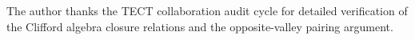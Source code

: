 \begin{acknowledgments}
The author thanks the TECT collaboration audit cycle for detailed
verification of the Clifford algebra closure relations and the
opposite-valley pairing argument.
\end{acknowledgments}





